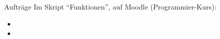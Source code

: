 \begin{frame}[fragile]{Aufträge}
Im Skript ``Funktionen'', auf Moodle (Programmier-Kurs):
\begin{itemize}
\item {}
\item {}
\end{itemize}
\end{frame}

